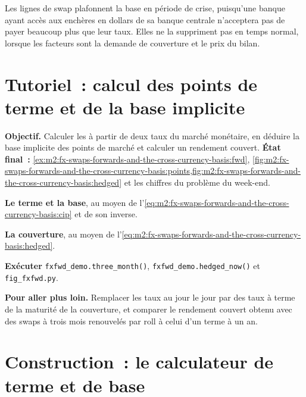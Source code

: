 Les lignes de swap plafonnent la base en période de crise, puisqu'une banque ayant accès aux
enchères en dollars de sa banque centrale n'acceptera pas de payer beaucoup plus que leur taux.
Elles ne la suppriment pas en temps normal, lorsque les facteurs sont la demande de couverture
et le prix du bilan.

\section{Tutoriel~: calcul des points de terme et de la base implicite}\label{tut:m2:fx-swaps-forwards-and-the-cross-currency-basis:basis}

\begin{tutorial}
\textbf{Objectif.} Calculer les  à partir de deux taux du marché monétaire, en déduire
la base implicite des points de marché et calculer un rendement couvert.
\textbf{État final~:}
\cref{ex:m2:fx-swaps-forwards-and-the-cross-currency-basis:fwd},
\cref{fig:m2:fx-swaps-forwards-and-the-cross-currency-basis:points,fig:m2:fx-swaps-forwards-and-the-cross-currency-basis:hedged}
et les chiffres du problème du week-end.
\begin{tutsteps}
\item \textbf{Le terme et la base}, au moyen de
l'\cref{eq:m2:fx-swaps-forwards-and-the-cross-currency-basis:cip} et de son inverse.
\label{lst:m2:fx-swaps-forwards-and-the-cross-currency-basis:fwd}
\item \textbf{La couverture}, au moyen de
l'\cref{eq:m2:fx-swaps-forwards-and-the-cross-currency-basis:hedged}.
\label{lst:m2:fx-swaps-forwards-and-the-cross-currency-basis:hedge}
\item \textbf{Exécuter} \texttt{fxfwd\_demo.three\_month()},
\texttt{fxfwd\_demo.hedged\_now()} et \texttt{fig\_fxfwd.py}.
\end{tutsteps}
\textbf{Pour aller plus loin.} Remplacer les taux au jour le jour par des taux à terme de la
maturité de la couverture, et comparer le rendement couvert obtenu avec des swaps à trois mois
renouvelés par roll à celui d'un terme à un an.
\end{tutorial}

\section{Construction~: le calculateur de terme et de base}\label{bld:m2:fx-swaps-forwards-and-the-cross-currency-basis:fxfwd}


